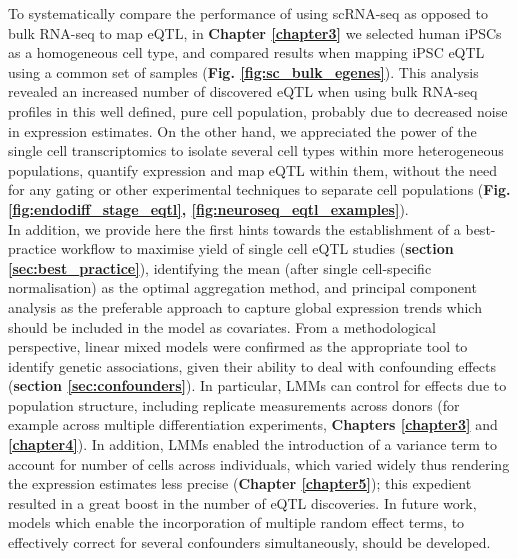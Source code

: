 To systematically compare the performance of using scRNA-seq as opposed to bulk RNA-seq to map eQTL, in \textbf{Chapter \ref{chapter3}} we selected human iPSCs as a homogeneous cell type, and compared results when mapping iPSC eQTL using a common set of samples (\textbf{Fig. \ref{fig:sc_bulk_egenes}}). 
This analysis revealed an increased number of discovered eQTL when using bulk RNA-seq profiles in this well defined, pure cell population, probably due to decreased noise in expression estimates.
On the other hand, we appreciated the power of the single cell transcriptomics to isolate several cell types within more heterogeneous populations, quantify expression and map eQTL within them, without the need for any gating or other experimental techniques to separate cell populations (\textbf{Fig. \ref{fig:endodiff_stage_eqtl}, \ref{fig:neuroseq_eqtl_examples}}). \\

In addition, we provide here the first hints towards the establishment of a best-practice workflow to maximise yield of single cell eQTL studies (\textbf{section \ref{sec:best_practice}}), identifying the mean (after single cell-specific normalisation) as the optimal aggregation method, and principal component analysis as the preferable approach to capture global expression trends which should be included in the model as covariates. 
From a methodological perspective, linear mixed models were confirmed as the appropriate tool to identify genetic associations, given their ability to deal with confounding effects (\textbf{section \ref{sec:confounders}}).
In particular, LMMs can control for effects due to population structure, including replicate measurements across donors (for example across multiple differentiation experiments, \textbf{Chapters \ref{chapter3}} and \textbf{\ref{chapter4}}).
In addition, LMMs enabled the introduction of a variance term to account for number of cells across individuals, which varied widely thus rendering the expression estimates less precise (\textbf{Chapter \ref{chapter5}}); this expedient resulted in a great boost in the number of eQTL discoveries. 
In future work, models which enable the incorporation of multiple random effect terms, to effectively correct for several confounders simultaneously, should be developed. 
\\

